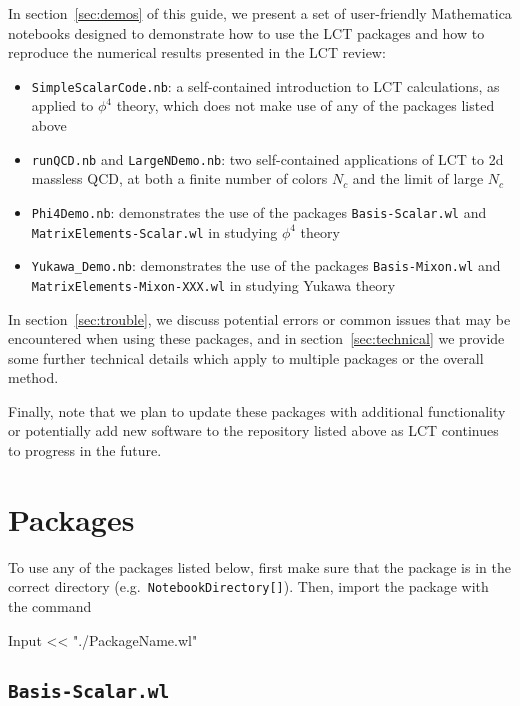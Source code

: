 \documentclass[12pt]{article}
\begin{document}
In section~\ref{sec:demos} of this guide, we present a set of user-friendly Mathematica notebooks designed to demonstrate how to use the LCT packages and how to reproduce the numerical results presented in the LCT review:
\begin{itemize}
\item {\tt SimpleScalarCode.nb}: a self-contained introduction to LCT calculations, as applied to $\phi^4$ theory, which does not make use of any of the packages listed above 
\item {\tt runQCD.nb} and {\tt LargeNDemo.nb}: two self-contained applications of LCT to 2d massless QCD, at both a finite number of colors $N_c$ and the limit of large $N_c$
\item {\tt Phi4Demo.nb}: demonstrates the use of the packages {\tt Basis-Scalar.wl} and
\\{\tt MatrixElements-Scalar.wl} in studying $\phi^4$ theory
\item {\tt Yukawa\_Demo.nb}: demonstrates the use of the packages {\tt Basis-Mixon.wl} and
\\{\tt MatrixElements-Mixon-XXX.wl} in studying Yukawa theory
\end{itemize}
In section~\ref{sec:trouble}, we discuss potential errors or common issues that may be encountered when using these packages, and in section~\ref{sec:technical} we provide some further technical details which apply to multiple packages or the overall method.

Finally, note that we plan to update these packages with additional functionality or potentially add new software to the repository listed above as LCT continues to progress in the future.


\section{Packages}
\label{sec:packages}

To use any of the packages listed below, first make sure that the package is in the correct directory (e.g.\ {\tt NotebookDirectory[]}). Then, import the package with the command \begin{mmaCell}[moredefined={<< "./PackageName.wl"}]{Input}
  << "./PackageName.wl"
\end{mmaCell}

\subsection{{\tt Basis-Scalar.wl}}
\end{document}
